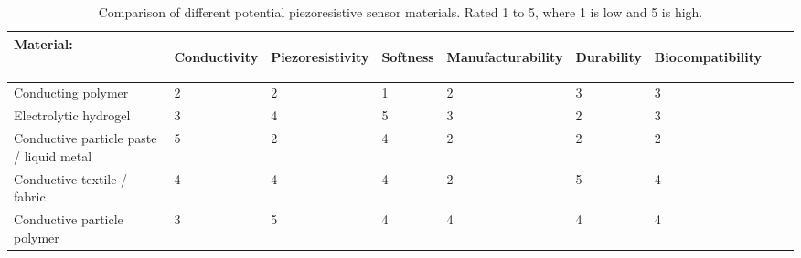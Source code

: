\begin{table}[H]
	\centering
	\caption{Comparison of different potential piezoresistive sensor materials. Rated 1 to 5, where 1 is low and 5 is high.}
	\label{tab:comparing-piezo-r-materials}
	\vspace{3cm}
	\begin{tabular}{|p{5cm}|p{1cm}|p{1cm}|p{1cm}|p{1cm}|p{1cm}|p{1cm}|p{1cm}|p{1cm}|}
		\multicolumn{1}{l}{\textbf{Material:}} & \multicolumn{1}{c}{\begin{rotate}{60} \hspace{0.1cm}\vspace{-2cm} \textbf{Conductivity} \end{rotate}} & 
		\multicolumn{1}{c}{\begin{rotate}{60} \hspace{0.2cm}\vspace{-2cm} \textbf{Piezoresistivity} \end{rotate}} & 
		\multicolumn{1}{c}{\begin{rotate}{60} \hspace{0.2cm}\vspace{-2cm} \textbf{Softness} \end{rotate}} & 
		\multicolumn{1}{c}{\begin{rotate}{60} \hspace{0.2cm}\vspace{-2cm} \textbf{Manufacturability} \end{rotate}} & 
		\multicolumn{1}{c}{\begin{rotate}{60} \hspace{0.2cm}\vspace{-2cm} \textbf{Durability} \end{rotate}} & 
		\multicolumn{1}{c}{\begin{rotate}{60} \hspace{0.2cm}\vspace{-2cm} \textbf{Biocompatibility} \end{rotate}} \\ \hline
		
		Conducting polymer \cite{Guo2018,Hazelton2023,Bhattacharjee2020,Mukherjee2023} & 2 & 2 & 1 & 2 & 3 & 3 \\ \hline
		Electrolytic hydrogel \cite{Guo2018,Shen2022,Li2020a,Li2020b,Lu2014,Wang2018} & 3 & 4 & 5 & 3 & 2 & 3   \\ \hline
		Conductive particle paste / liquid metal \cite{Chen2020a,Park2010,Jung2015} & 5 & 2 & 4 & 2 & 2 & 2 \\ \hline
		Conductive textile / fabric \cite{Jeong2020a,Yao2012,Rashid2022} & 4 & 4 & 4 & 2 & 5 & 4  \\ \hline
		Conductive particle polymer \cite{Princy1998,Spahr2017,Duan2014,Buketov2020} & 3 & 5 & 4 & 4 & 4 & 4 \\ \hline
	\end{tabular}
\end{table}

